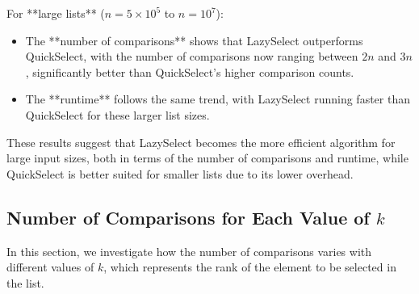 \documentclass{article}
\begin{document}
\noindent For **large lists** (\(n = 5 \times 10^5\) to \(n = 10^7\)):
\begin{itemize}
    \item The **number of comparisons** shows that LazySelect outperforms QuickSelect, with the number of comparisons now ranging between \(2n\) and \(3n\), significantly better than QuickSelect’s higher comparison counts.
    \item The **runtime** follows the same trend, with LazySelect running faster than QuickSelect for these larger list sizes.
\end{itemize}

These results suggest that LazySelect becomes the more efficient algorithm for large input sizes, both in terms of the number of comparisons and runtime, while QuickSelect is better suited for smaller lists due to its lower overhead.

\subsection{Number of Comparisons for Each Value of \(k\)}

In this section, we investigate how the number of comparisons varies with different values of \(k\), which represents the rank of the element to be selected in the list.
\end{document}
